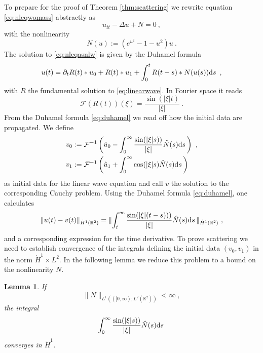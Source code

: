 \documentclass[a4paper]{amsart}
\newtheorem{lemma}[thm]{Lemma}
\providecommand{\abs}[1]{\lvert #1 \rvert}
\providecommand{\dint}[1]{ {\rm d} #1\,}
\providecommand{\norm}[1]{\lVert #1 \rVert}
\begin{document}
To prepare for the proof of Theorem \ref{thm:scattering} we rewrite
equation \eqref{eq:nleqwomass} abstractly as
\begin{equation}
  u_{tt} - {\Delta} u + N = 0\ ,
  \label{eq:nleqasnlw}
\end{equation}
with the nonlinearity
\begin{equation*}
  N(u)
  :=
  \left(
  e^{u^2} - 1 - u^2
  \right)
  u\ .
\end{equation*}
The solution to \eqref{eq:nleqasnlw} is given by the Duhamel formula
\begin{equation}
  u(t)
  =
  {\partial}_t R(t)
  \ast
  u_0
  +
  R(t)
  \ast
  u_1
  +
  \int_0^t
  R(t-s)
  \ast
  N(u(s))
  \dint{s}\ ,
  \label{eq:duhamel}
\end{equation}
with $R$ the fundamental solution to \eqref{eq:linearwave}. In Fourier space it reads
\begin{equation*}
  {\mathcal{F}}(R(t))(\xi)
  =
  \frac{\sin(\abs{\xi} t)}{\abs{\xi}}\ .
\end{equation*}
From the Duhamel formula \eqref{eq:duhamel} we read off how the
initial data are propagated. We define
\begin{align*}
  v_0
  &:=
  {\mathcal{F}}^{-1}
  \left(
  \hat{u}_0
  -
  \int_0^\infty
  \frac{\sin(\abs{\xi} s))}{\abs{\xi}}
  \hat{N}(s)
  \dint{s}
  \right)
  \ , \\
  v_1
  &:=
  {\mathcal{F}}^{-1}
  \left(
  \hat{u}_1
  +
  \int_0^\infty
  \cos(\abs{\xi} s)
  \hat{N}(s)
  \dint{s}
  \right)
\end{align*}
as initial data for the linear wave equation and call $v$ the solution
to the corresponding Cauchy problem. Using the Duhamel formula
\eqref{eq:duhamel},  one calculates
\begin{equation}
  \norm{u(t) - v(t)}_{\dot{H}^1({\mathbb{R}}^2)}
  =
  \norm{
  \int_t^\infty 
  \frac{\sin(\abs{\xi} (t-s)))}{\abs{\xi}}
  \hat{N}(s)
  \dint{s}
  }_{\dot{H}^1({\mathbb{R}}^2)} \ ,
  \label{eq:difftoscatt}
\end{equation}
and a corresponding expression for the time derivative. To
prove scattering we need to establish convergence of the integrals
defining the initial data $(v_0,v_1)$ in the norm $\dot{H}^1 \times
L^2$. In the following lemma we reduce this problem to a bound on the
nonlinearity $N$.
\begin{lemma}
  If
  \begin{equation*}
    \norm{N}_{L^{1}(([0,\infty); L^{2}({\mathbb{R}}^2))} < \infty
    \ ,
  \end{equation*}
  the integral
  \begin{equation*}
    \int_0^\infty 
    \frac{\sin(\abs{\xi} s))}{\abs{\xi}}
    \hat{N}(s)
    \dint{s}
  \end{equation*}
  converges in $\dot{H}^1$.
  \label{lem:normcontrolimpliesconvergence}
\end{lemma}
\end{document}
